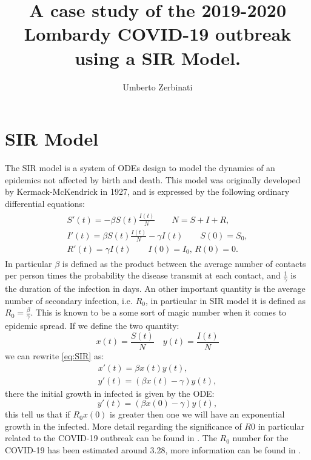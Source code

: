\documentclass[]{article}
\title{A case study of the 2019-2020 Lombardy COVID-19 outbreak using a SIR Model.}
\author{Umberto Zerbinati}
\begin{document}
\maketitle

\begin{abstract}

\end{abstract}

\section{SIR Model}
The SIR model is a system of ODEs design to model the dynamics of an epidemics not affected by birth and death. This model was originally developed by Kermack-McKendrick in 1927, and is expressed by the following ordinary differential equations:
\begin{align}
	\label{eq:SIR}
	\begin{split}
		S'(t) = -\beta S(t) \frac{I(t)}{N}\qquad N = S+I+R,\\
		I'(t) = \beta S(t) \frac{I(t)}{N}-\gamma I(t) \qquad S(0) = S_0,\\
		R'(t) = \gamma I(t)\qquad I(0)=I_0,\, R(0)=0.
	\end{split}
\end{align}
In particular $\beta$ is defined as the product between the average number of contacts per person times the probability the disease transmit at each contact, and $\frac{1}{\gamma}$ is the duration of the infection in days. An other important quantity is the average number of secondary infection, i.e. $R_0$, in particular in SIR model it is defined as $R_0 = \frac{\beta}{\gamma}$. This is known to be a some sort of magic number when it comes to epidemic spread. If we define the two quantity:
\begin{equation}
	x(t) = \frac{S(t)}{N}\quad y(t)=\frac{I(t)}{N}
\end{equation}
we can rewrite \eqref{eq:SIR} as:
\begin{align}
	x'(t) = \beta x(t)y(t),\\
	y'(t) = (\beta x(t)-\gamma)y(t),
\end{align}
there the initial growth in infected is given by the ODE:
\begin{equation}
	y'(t)=(\beta x(0)-\gamma)y(t),
\end{equation}
this tell us that if $R_0x(0)$ is greater then one we will have an exponential growth in the infected. More detail regarding the significance of $R0$ in particular related to the COVID-19 outbreak can be found in \cite{viceconte2020covid}. The $R_0$ number for the COVID-19 has been estimated around 3.28, more information can be found in \cite{liu2020}.
\end{document}
